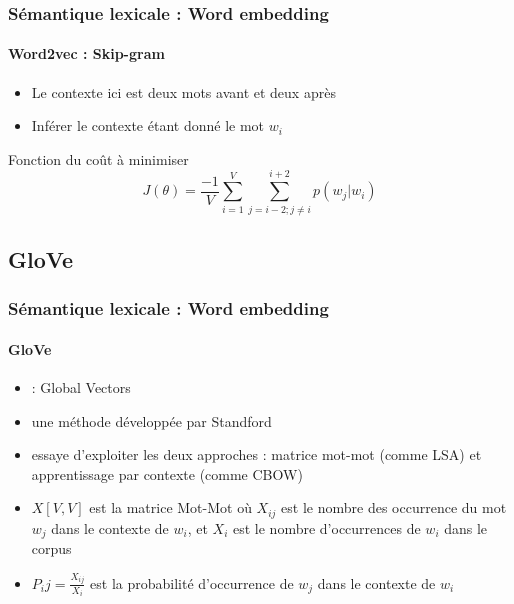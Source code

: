 \documentclass[xcolor=table]{beamer}
\begin{document}
\begin{frame}
	\frametitle{Sémantique lexicale : Word embedding}
	\framesubtitle{Word2vec : Skip-gram}
	\begin{minipage}{.58\textwidth}
		\begin{itemize}
			\item Le contexte ici est deux mots avant et deux après
			\item Inférer le contexte étant donné le mot $w_i$
		\end{itemize}
		\begin{block}{Fonction du coût à minimiser}
			\[%
			J(\theta) = \frac{-1}{V} \sum_{i=1}^{V} \sum_{j= i-2; j \ne i}^{i+2} p(w_j |w_i)
			\]
		\end{block}
	\end{minipage}
	\begin{minipage}{.08\textwidth}
	\end{minipage}
	\begin{minipage}{.4\textwidth}
	\end{minipage}
	
\end{frame}

\subsection{GloVe}

\begin{frame}
\frametitle{Sémantique lexicale : Word embedding}
\framesubtitle{GloVe}

\begin{itemize}
	\item {} : Global Vectors
	\item une méthode développée par Standford \cite{2014-pennington-al}
	\item essaye d'exploiter les deux approches : matrice mot-mot (comme LSA) et apprentissage par contexte (comme CBOW)
	\item $X[V, V]$ est la matrice Mot-Mot où $X_{ij}$ est le nombre des occurrence du mot $w_j$ dans le contexte de $w_i$, et $X_i$ est le nombre d'occurrences de $w_i$ dans le corpus
	\item $P_ij= \frac{X_{ij}}{X_i}$ est la probabilité d'occurrence de $w_j$ dans le contexte de $w_i$
\end{itemize}


\end{frame}
\end{document}
